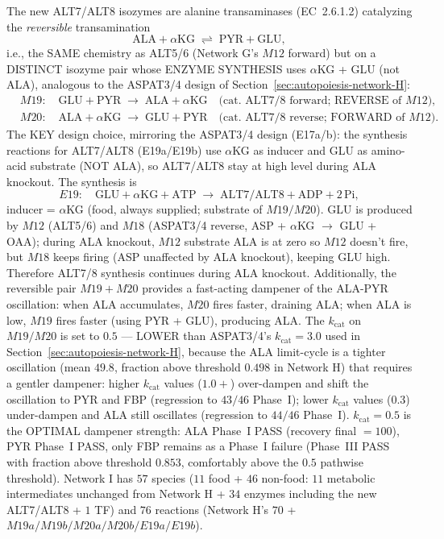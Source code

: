 \documentclass[11pt,a4paper]{article}
\theoremstyle{plain}
\theoremstyle{definition}
\theoremstyle{remark}
\begin{document}
The new ALT7/ALT8 isozymes are alanine transaminases (EC~2.6.1.2)
catalyzing the \emph{reversible} transamination
\[
  \mathrm{ALA} + \alpha\mathrm{KG} \;\rightleftharpoons\; \mathrm{PYR} + \mathrm{GLU},
\]
i.e., the SAME chemistry as ALT5/6 (Network G's $M12$ forward) but on a
DISTINCT isozyme pair whose ENZYME SYNTHESIS uses $\alpha$KG + GLU (not
ALA), analogous to the ASPAT3/4 design of Section~\ref{sec:autopoiesis-network-H}:
\begin{equation}\label{eq:netI-M19-M20}
\begin{aligned}
  &M19: \quad \mathrm{GLU} + \mathrm{PYR} \;\to\; \mathrm{ALA} + \alpha\mathrm{KG}
  \quad \text{(cat.\ ALT7/8 forward; REVERSE of $M12$)}, \\
  &M20: \quad \mathrm{ALA} + \alpha\mathrm{KG} \;\to\; \mathrm{GLU} + \mathrm{PYR}
  \quad \text{(cat.\ ALT7/8 reverse; FORWARD of $M12$)}.
\end{aligned}
\end{equation}
The KEY design choice, mirroring the ASPAT3/4 design (E17a/b): the
synthesis reactions for ALT7/ALT8 (E19a/E19b) use $\alpha$KG as inducer
and GLU as amino-acid substrate (NOT ALA), so ALT7/ALT8 stay at high
level during ALA knockout. The synthesis is
\[
  E19: \quad \mathrm{GLU} + \alpha\mathrm{KG} + \mathrm{ATP} \;\to\;
  \mathrm{ALT7}/\mathrm{ALT8} + \mathrm{ADP} + 2\,\mathrm{Pi},
\]
inducer = $\alpha$KG (food, always supplied; substrate of $M19/M20$).
GLU is produced by $M12$ (ALT5/6) and $M18$ (ASPAT3/4 reverse, ASP +
$\alpha$KG $\to$ GLU + OAA); during ALA knockout, $M12$ substrate ALA
is at zero so $M12$ doesn't fire, but $M18$ keeps firing (ASP
unaffected by ALA knockout), keeping GLU high. Therefore ALT7/8
synthesis continues during ALA knockout. Additionally, the reversible
pair $M19 + M20$ provides a fast-acting dampener of the ALA-PYR
oscillation: when ALA accumulates, $M20$ fires faster, draining ALA;
when ALA is low, $M19$ fires faster (using PYR + GLU), producing ALA.
The $k_{\mathrm{cat}}$ on $M19/M20$ is set to $0.5$ --- LOWER than
ASPAT3/4's $k_{\mathrm{cat}} = 3.0$ used in Section~\ref{sec:autopoiesis-network-H}, because the ALA limit-cycle is a tighter oscillation
(mean $49.8$, fraction above threshold $0.498$ in Network H) that
requires a gentler dampener: higher $k_{\mathrm{cat}}$ values ($1.0+$)
over-dampen and shift the oscillation to PYR and FBP (regression to
$43/46$ Phase~I); lower $k_{\mathrm{cat}}$ values ($0.3$) under-dampen
and ALA still oscillates (regression to $44/46$ Phase~I). $k_{\mathrm{
cat}} = 0.5$ is the OPTIMAL dampener strength: ALA Phase~I PASS
(recovery final $= 100$), PYR Phase~I PASS, only FBP remains as a
Phase~I failure (Phase~III PASS with fraction above threshold $0.853$,
comfortably above the $0.5$ pathwise threshold). Network I has $57$
species ($11$ food + $46$ non-food: $11$ metabolic intermediates
unchanged from Network H + $34$ enzymes including the new ALT7/ALT8 +
$1$ TF) and $76$ reactions (Network H's $70$ + $M19a/M19b/M20a/M20b/
E19a/E19b$).
\end{document}
